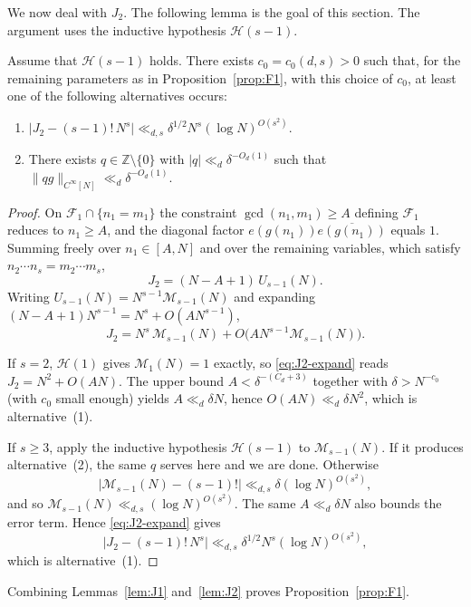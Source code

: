 We now deal with $J_2$. The following lemma is the goal of this section. The argument uses the inductive hypothesis $\mathcal{H}(s-1)$.
\begin{lemma}\label{lem:J2}
Assume that $\mathcal{H}(s-1)$ holds.
There exists $c_0=c_0(d,s)>0$ such that, for the remaining parameters as in Proposition~\ref{prop:F1}, with this choice of $c_0$, at least one of the following alternatives occurs:
\begin{enumerate}
    \item $\big|J_2-(s-1)!\,N^s\big|\ll_{d,s}\delta^{1/2} N^s(\log N)^{O(s^2)}$.
    \item There exists $q\in\mathbb{Z}\setminus\{0\}$ with $|q|\ll_d\delta^{-O_d(1)}$ such that $\|qg\|_{C^\infty[N]}\ll_d\delta^{-O_d(1)}$.
\end{enumerate}
\end{lemma}
\begin{proof}
On $\mathscr{F}_1\cap\{n_1=m_1\}$ the constraint $\gcd(n_1,m_1)\geq A$ defining $\mathscr{F}_1$ reduces to $n_1\geq A$, and the diagonal factor $e(g(n_1))\overline{e(g(n_1))}$ equals $1$.
Summing freely over $n_1\in[A,N]$ and over the remaining variables, which satisfy $n_2\cdots n_s=m_2\cdots m_s$,
\[
J_2=(N-A+1)\,U_{s-1}(N).
\]
Writing $U_{s-1}(N)=N^{s-1}\mathcal{M}_{s-1}(N)$ and expanding $(N-A+1)N^{s-1}=N^s+O(AN^{s-1})$,
\begin{equation}\label{eq:J2-expand}
J_2=N^s\,\mathcal{M}_{s-1}(N)+O\!\big(AN^{s-1}\mathcal{M}_{s-1}(N)\big).
\end{equation}

If $s=2$, $\mathcal{H}(1)$ gives $\mathcal{M}_1(N)=1$ exactly, so \eqref{eq:J2-expand} reads $J_2=N^2+O(AN)$.
The upper bound $A<\delta^{-(C_d+3)}$ together with $\delta>N^{-c_0}$ (with $c_0$ small enough) yields
$A\ll_{d}\delta N$, hence $O(AN)\ll_{d}\delta N^2$, which is alternative~(1).

If $s\geq 3$, apply the inductive hypothesis $\mathcal{H}(s-1)$ to $\mathcal{M}_{s-1}(N)$.
If it produces alternative~(2), the same $q$ serves here and we are done.
Otherwise
\[
\big|\mathcal{M}_{s-1}(N)-(s-1)!\big|\ll_{d,s}\delta(\log N)^{O(s^2)},
\]
and so $\mathcal{M}_{s-1}(N)\ll_{d,s}(\log N)^{O(s^2)}$.
 The same $A\ll_d \delta N$ also bounds the error term.
Hence \eqref{eq:J2-expand} gives
\[
\bigl|J_2-(s-1)!\,N^s\bigr|\ll_{d,s}\delta^{1/2} N^s(\log N)^{O(s^2)},
\]
which is alternative~(1).
\end{proof}

Combining Lemmas~\ref{lem:J1} and~\ref{lem:J2} proves Proposition~\ref{prop:F1}.

